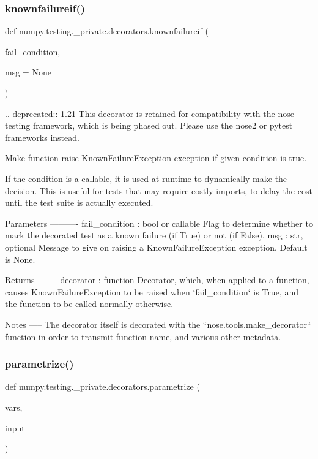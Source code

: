 \subsubsection{\texorpdfstring{knownfailureif()}{knownfailureif()}}
{\footnotesize\ttfamily def numpy.\+testing.\+\_\+private.\+decorators.\+knownfailureif (\begin{DoxyParamCaption}\item[{}]{fail\+\_\+condition,  }\item[{}]{msg = {\ttfamily None} }\end{DoxyParamCaption})}

\begin{DoxyVerb}.. deprecated:: 1.21
    This decorator is retained for compatibility with the nose testing framework, which is being phased out.
    Please use the nose2 or pytest frameworks instead.

Make function raise KnownFailureException exception if given condition is true.

If the condition is a callable, it is used at runtime to dynamically
make the decision. This is useful for tests that may require costly
imports, to delay the cost until the test suite is actually executed.

Parameters
----------
fail_condition : bool or callable
    Flag to determine whether to mark the decorated test as a known
    failure (if True) or not (if False).
msg : str, optional
    Message to give on raising a KnownFailureException exception.
    Default is None.

Returns
-------
decorator : function
    Decorator, which, when applied to a function, causes
    KnownFailureException to be raised when `fail_condition` is True,
    and the function to be called normally otherwise.

Notes
-----
The decorator itself is decorated with the ``nose.tools.make_decorator``
function in order to transmit function name, and various other metadata.\end{DoxyVerb}
 \mbox{\label{namespacenumpy_1_1testing_1_1__private_1_1decorators_aa6cf833d5d841e31f13cc84d4228d78a}} 
\subsubsection{\texorpdfstring{parametrize()}{parametrize()}}
{\footnotesize\ttfamily def numpy.\+testing.\+\_\+private.\+decorators.\+parametrize (\begin{DoxyParamCaption}\item[{}]{vars,  }\item[{}]{input }\end{DoxyParamCaption})}

